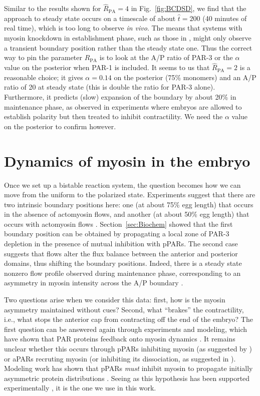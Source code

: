 \documentclass[11pt]{article}
\newcommand{\red}[1]{\color{red}#1\normalcolor}
\newcommand{\6}[1]{#1_{\text{6}}}
\newcommand{\3}[1]{#1_{\text{3}}}
\begin{document}
Similar to the results shown for $\hat R_\text{PA}=4$ in Fig.\ \ref{fig:BCDSD}, we find that the approach to steady state occurs on a timescale of about $\hat t = 200$ (40 minutes of real time), which is too long to observe \emph{in vivo}. The means that systems with myosin knockdown in establishment phase, such as those in \cite{zonies2010symmetry}, might only observe a transient boundary position rather than the steady state one. Thus the correct way to pin the parameter $\hat R_\text{PA}$ is to look at the A/P ratio of PAR-3 or the $\alpha$ value on the posterior when PAR-1 is included. It seems to us that $\hat R_\text{PA}=2$ is a reasonable choice; it gives $\alpha=0.14$ on the posterior (75\% monomers) and an A/P ratio of 20 at steady state (this is double the ratio for PAR-3 alone). Furthermore, it predicts (slow) expansion of the boundary by about 20\% in maintenance phase, as observed in experiments where embryos are allowed to establish polarity but then treated to inhibit contractility. \red{We need the $\alpha$ value on the posterior to confirm however.}

\newpage
\section{Dynamics of myosin in the embryo \label{sec:myosin}}
Once we set up a bistable reaction system, the question becomes how we can move from the uniform to the polarized state. Experiments suggest that there are two intrinsic boundary positions here: one (at about 75\% egg length) that occurs in the absence of actomyosin flows, and another (at about 50\% egg length) that occurs with actomyosin flows \cite{zonies2010symmetry}. Section\ \ref{sec:Biochem} showed that the first boundary position can be obtained by propagating a local zone of PAR-3 depletion in the presence of mutual inhibition with pPARs. The second case suggests that flows alter the flux balance between the anterior and posterior domains, thus shifting the boundary positions. Indeed, there is a steady state nonzero flow profile observed during maintenance phase, corresponding to an asymmetry in myosin intensity across the A/P boundary \cite{sailer2015dynamic}.

Two questions arise when we consider this data: first, how is the myosin asymmetry maintained without cues? Second, what ``brakes'' the contractility, i.e., what stops the anterior cap from contracting off the end of the embryo? The first question can be answered again through experiments and modeling, which have shown that PAR proteins feedback onto myosin dynamics \cite{gross2019guiding, beatty20132}. It remains unclear whether this occurs through pPARs inhibiting myosin (as suggested by \cite{beatty20132}) or aPARs recruting myosin (or inhibiting its dissociation, as suggested in \cite{gross2019guiding}). Modeling work has shown that pPARs \emph{must} inhibit myosin to propagate initially asymmetric protein distributions \cite{kravtsova2014actomyosin}. Seeing as this hypothesis has been supported experimentally \cite{munro2004cortical, beatty20132}, it is the one we use in this work.
\end{document}
